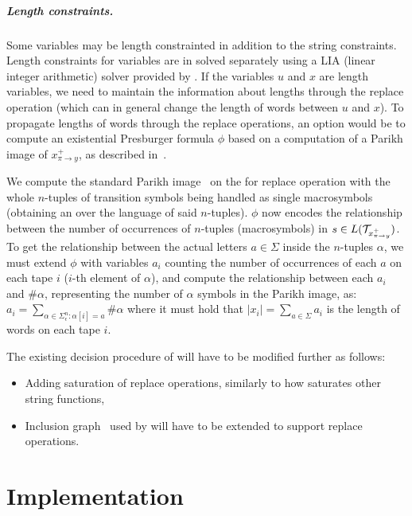 \paragraph{Length constraints.}
Some variables may be length constrainted in addition to the string constraints.
Length constraints for variables are in \noodler solved separately using a LIA (linear integer arithmetic) solver provided by \ziii.
If the variables $u$ and $x$ are length variables, we need to maintain the information about lengths through the replace operation (which can in general change the length of words between $u$ and $x$).
To propagate lengths of words through the replace operations, an option would be to compute an existential Presburger formula $\phi$ based on a computation of a Parikh image of $x^{+}_{\pi \rightarrow y}$, as described in~\cite{ChainFree}.

We compute the standard Parikh image~\cite{DBLP:conf/icalp/SeidlSMH04} on the \nft for replace operation with the whole $n$-tuples of transition symbols being handled as single macrosymbols (obtaining an \nfa over the language of said $n$-tuples).
$\phi$ now encodes the relationship between the number of occurrences of $n$-tuples (macrosymbols) in $s \in L(\mathcal{T}_{x^{+}_{\pi \rightarrow y}})$.
To get the relationship between the actual letters $a \in \Sigma$ inside the $n$-tuples $\alpha$, we must extend $\phi$ with variables $a_i$ counting the number of occurrences of each $a$ on each tape $i$ ($i$-th element of $\alpha$), and compute the relationship between each $a_i$ and $\#\alpha$, representing the number of $\alpha$ symbols in the Parikh image, as: $a_i = \sum_{\alpha \in \Sigma^n_{\epsilon}: \alpha[i] = a} \#\alpha$ where it must hold that $|x_i| = \sum_{a \in \Sigma} a_i $ is the length of words on each tape $i$.

The existing decision procedure of \noodler will have to be modified further as follows:
\begin{itemize}
  \item Adding saturation of replace operations, similarly to how \noodler saturates other string functions,
  \item Inclusion graph~\cite{fm23_equations_synergy_regular_constraints_DBLP:conf/fm/BlahoudekCCHHLS23} used by \noodler will have to be extended to support replace operations.
\end{itemize}

\chapter{Implementation}

